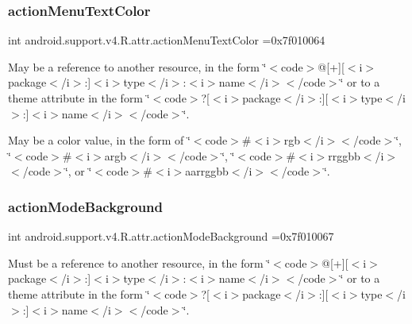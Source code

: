 \subsubsection{\texorpdfstring{action\+Menu\+Text\+Color}{actionMenuTextColor}}
{\footnotesize\ttfamily int android.\+support.\+v4.\+R.\+attr.\+action\+Menu\+Text\+Color =0x7f010064\hspace{0.3cm}{\ttfamily [static]}}

May be a reference to another resource, in the form \char`\"{}$<$code$>$@\mbox{[}+\mbox{]}\mbox{[}$<$i$>$package$<$/i$>$\+:\mbox{]}$<$i$>$type$<$/i$>$\+:$<$i$>$name$<$/i$>$$<$/code$>$\char`\"{} or to a theme attribute in the form \char`\"{}$<$code$>$?\mbox{[}$<$i$>$package$<$/i$>$\+:\mbox{]}\mbox{[}$<$i$>$type$<$/i$>$\+:\mbox{]}$<$i$>$name$<$/i$>$$<$/code$>$\char`\"{}. 

May be a color value, in the form of \char`\"{}$<$code$>$\#$<$i$>$rgb$<$/i$>$$<$/code$>$\char`\"{}, \char`\"{}$<$code$>$\#$<$i$>$argb$<$/i$>$$<$/code$>$\char`\"{}, \char`\"{}$<$code$>$\#$<$i$>$rrggbb$<$/i$>$$<$/code$>$\char`\"{}, or \char`\"{}$<$code$>$\#$<$i$>$aarrggbb$<$/i$>$$<$/code$>$\char`\"{}. \mbox{\label{classandroid_1_1support_1_1v4_1_1R_1_1attr_ac4c7f5acc692e04adae25d9567546265}} 
\subsubsection{\texorpdfstring{action\+Mode\+Background}{actionModeBackground}}
{\footnotesize\ttfamily int android.\+support.\+v4.\+R.\+attr.\+action\+Mode\+Background =0x7f010067\hspace{0.3cm}{\ttfamily [static]}}

Must be a reference to another resource, in the form \char`\"{}$<$code$>$@\mbox{[}+\mbox{]}\mbox{[}$<$i$>$package$<$/i$>$\+:\mbox{]}$<$i$>$type$<$/i$>$\+:$<$i$>$name$<$/i$>$$<$/code$>$\char`\"{} or to a theme attribute in the form \char`\"{}$<$code$>$?\mbox{[}$<$i$>$package$<$/i$>$\+:\mbox{]}\mbox{[}$<$i$>$type$<$/i$>$\+:\mbox{]}$<$i$>$name$<$/i$>$$<$/code$>$\char`\"{}. \mbox{\label{classandroid_1_1support_1_1v4_1_1R_1_1attr_af028384bcaaf01be4eb4a6a14490f887}} 
